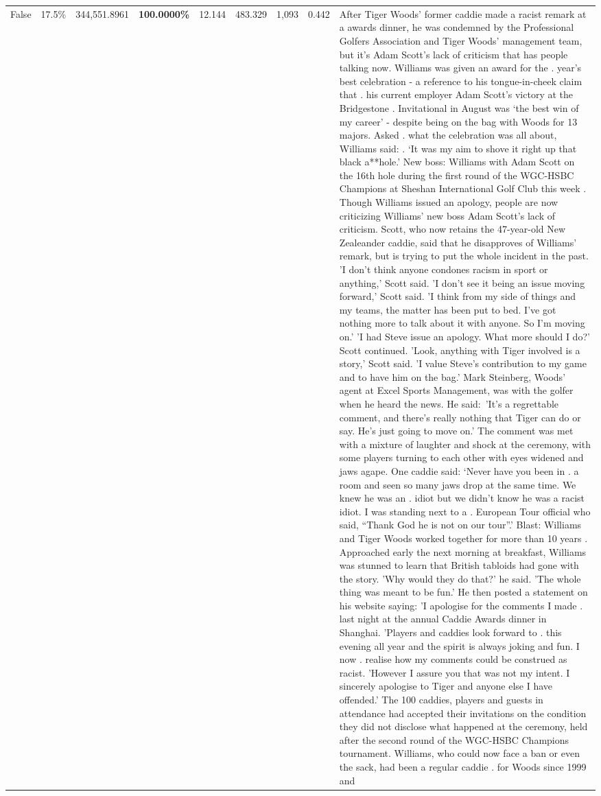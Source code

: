 \begin{table}[H]
\begin{tabular}{lllrlllll}
False & 17.5\% & 344,551.8961 & \bfseries \color{red} 100.0000\% & 12.144 & 483.329 & 1,093 & 0.442 & After Tiger Woods' former caddie made a racist remark at a awards dinner, he was condemned by the Professional Golfers Association and Tiger Woods' management team, but it's Adam Scott's lack of criticism that has people talking now. Williams was given an award for the . year’s best celebration - a reference to his tongue-in-cheek claim that . his current employer Adam Scott’s victory at the Bridgestone . Invitational in August was ‘the best win of my career’ - despite being on the bag with Woods for 13 majors. Asked . what the celebration was all about, Williams said: . ‘It was my aim to shove it right up that black a**hole.’ New boss: Williams with Adam Scott  on the 16th hole during the first round of the WGC-HSBC Champions at Sheshan International Golf Club this week . Though Williams issued an apology, people are now criticizing Williams' new boss Adam Scott's lack of criticism. Scott, who now retains the 47-year-old New Zealeander caddie, said that he disapproves of Williams' remark, but is trying to put the whole incident in the past. 'I don't think anyone condones racism in sport or anything,' Scott said. 'I don't see it being an issue moving forward,' Scott said. 'I think from my side of things and my teams, the matter has been put to bed. I've got nothing more to talk about it with anyone. So I'm moving on.' 'I had Steve issue an apology. What more should I do?' Scott continued. 'Look, anything with Tiger involved is a story,' Scott said. 'I value Steve's contribution to my game and to have him on the bag.' Mark Steinberg, Woods' agent at Excel Sports Management, was with the golfer when he heard the news. He said: 'It's a regrettable comment, and there's really nothing that Tiger can do or say. He's just going to move on.' The comment was met with a mixture of laughter and shock at the ceremony, with some players turning to each other with eyes widened and jaws agape. One caddie said: ‘Never have you been in . a room and seen so many jaws drop at the same time. We knew he was an . idiot but we didn’t know he was a racist idiot. I was standing next to a . European Tour official who said, “Thank God he is not on our tour”.’ Blast: Williams and Tiger Woods worked together for more than 10 years . Approached early the next morning at breakfast, Williams was stunned to learn that British tabloids had gone with the story. 'Why would they do that?' he said. 'The whole thing was meant to be fun.' He then posted a statement on his website saying: 'I apologise for the comments I made . last night at the annual Caddie Awards dinner in Shanghai. 'Players and caddies look forward to . this evening all year and the spirit is always joking and fun. I now . realise how my comments could be construed as racist. 'However I assure you that was not my intent. I sincerely apologise to Tiger and anyone else I have offended.' The 100 caddies, players and guests in attendance had accepted their invitations on the condition they did not disclose what happened at the ceremony, held after the second round of the WGC-HSBC Champions tournament. Williams, who could now face a ban or even the sack, had been a regular caddie . for Woods since 1999 and 
\end{tabular}
\end{table}
